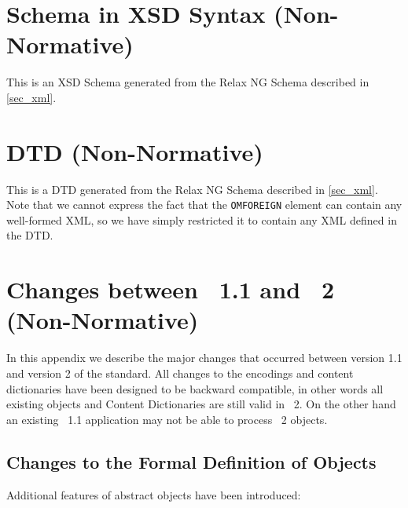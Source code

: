 \begin{appendix}
\chapter{\OM Schema in XSD Syntax (Non-Normative)}\label{app_xsd}
This is an XSD Schema generated from the Relax NG Schema described in \ref{sec_xml}.
  


\chapter{\OM DTD (Non-Normative)}\label{app_dtd}

This is a DTD generated from the Relax NG Schema described in \ref{sec_xml}.  Note that we
cannot express the fact that the \lstinline|OMFOREIGN| element can contain any
well-formed XML, so we have simply restricted it to contain any XML defined in the DTD.
  


\chapter{Changes between \OM~1.1 and \OM~2 (Non-Normative)}\label{app_whats_new}
  
In this appendix we describe the major changes that occurred between version 1.1 and
version 2 of the \OM standard. All changes to the encodings and content dictionaries have
been designed to be backward compatible, in other words all existing \OM objects and
Content Dictionaries are still valid in \OM~2.  On the other hand an existing \OM~1.1
application may not be able to process \OM~2 objects.
  
\section{Changes to the Formal Definition of Objects}\label{chgformal}
    
Additional features of abstract objects have been introduced:


\end{appendix}
